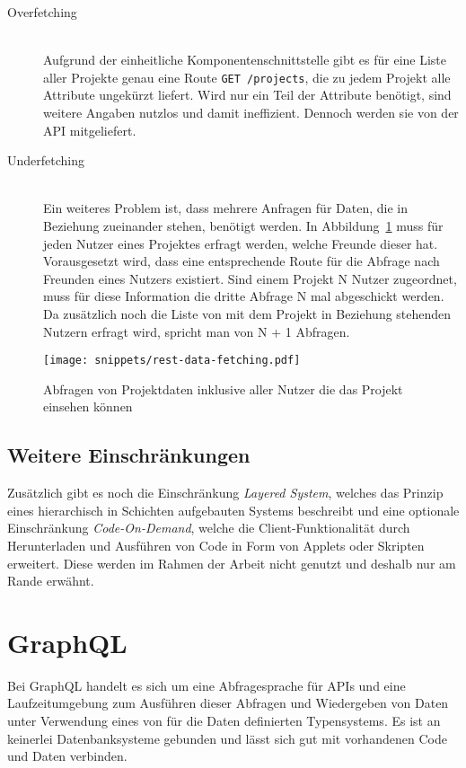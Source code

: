 \begin{description}
	\item[Overfetching\label{rest:overfetching}] \ \\
	Aufgrund der einheitliche Komponentenschnittstelle gibt es für eine Liste aller Projekte genau eine Route \texttt{GET /projects}, die zu jedem Projekt alle Attribute ungekürzt liefert. Wird nur ein Teil der Attribute benötigt, sind weitere Angaben nutzlos und damit ineffizient.
	Dennoch werden sie von der API mitgeliefert.
	\item[Underfetching\label{rest:underfetching}] \ \\
	Ein weiteres Problem ist, dass mehrere Anfragen für Daten, die in Beziehung zueinander stehen, benötigt werden. In Abbildung~\ref{basics:rest:data-fetching} muss für jeden Nutzer eines Projektes erfragt werden, welche Freunde dieser hat. Vorausgesetzt wird, dass eine entsprechende Route für die Abfrage nach Freunden eines Nutzers existiert.
	Sind einem Projekt N Nutzer zugeordnet, muss für diese Information die dritte Abfrage N mal abgeschickt werden. Da zusätzlich noch die Liste von mit dem Projekt in Beziehung stehenden Nutzern erfragt wird, spricht man von N + 1 Abfragen.
\end{description}

\begin{figure}[h!]
	\centering
	\texttt{[image: snippets/rest-data-fetching.pdf]}
	\caption{Abfragen von Projektdaten inklusive aller Nutzer die das Projekt einsehen können}
	\label{basics:rest:data-fetching}
\end{figure}

\subsection{Weitere Einschränkungen}
Zusätzlich gibt es noch die Einschränkung \emph{Layered System}, welches das Prinzip eines hierarchisch in Schichten aufgebauten Systems
beschreibt und eine optionale Einschränkung \emph{Code-On-Demand}, welche die Client-Funktionalität durch Herunterladen und Ausführen von Code in
Form von Applets oder Skripten erweitert. Diese werden im Rahmen der Arbeit nicht genutzt und deshalb nur am Rande erwähnt.

\section{GraphQL}
\label{sec:basics:graphql}
Bei GraphQL handelt es sich um eine Abfragesprache für APIs und eine Laufzeitumgebung
zum Ausführen dieser Abfragen und Wiedergeben von Daten unter Verwendung eines von für die Daten definierten Typensystems.
Es ist an keinerlei Datenbanksysteme gebunden und lässt sich gut mit vorhandenen Code und Daten verbinden.

